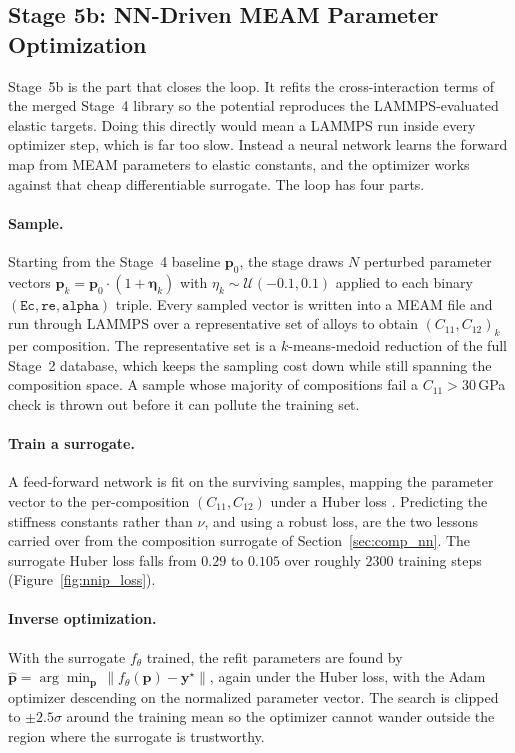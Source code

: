 \subsection{Stage 5b: NN-Driven MEAM Parameter Optimization}
\label{sec:nnip}

Stage~5b is the part that closes the loop. It refits the cross-interaction
terms of the merged Stage~4 library so the potential reproduces the
LAMMPS-evaluated elastic targets. Doing this directly would mean a LAMMPS run
inside every optimizer step, which is far too slow. Instead a neural network
learns the forward map from MEAM parameters to elastic constants, and the
optimizer works against that cheap differentiable surrogate. The loop has four
parts.

\paragraph{Sample.}
Starting from the Stage~4 baseline $\mathbf{p}_0$, the stage draws $N$
perturbed parameter vectors
$\mathbf{p}_k = \mathbf{p}_0 \cdot (1+\boldsymbol{\eta}_k)$ with
$\eta_k\sim\mathcal{U}(-0.1,0.1)$ applied to each binary
$(\texttt{Ec},\texttt{re},\texttt{alpha})$ triple. Every sampled vector is
written into a MEAM file and run through LAMMPS over a representative set of
alloys to obtain $(C_{11},C_{12})_k$ per composition. The representative set
is a $k$-means-medoid reduction of the full Stage~2 database, which keeps the
sampling cost down while still spanning the composition space. A sample whose
majority of compositions fail a $C_{11}>30$\,GPa check is thrown out before it
can pollute the training set.

\paragraph{Train a surrogate.}
A feed-forward network is fit on the surviving samples, mapping the parameter
vector to the per-composition $(C_{11},C_{12})$ under a Huber loss
\citep{tensorflow2015}. Predicting the stiffness constants rather than $\nu$,
and using a robust loss, are the two lessons carried over from the composition
surrogate of Section~\ref{sec:comp_nn}. The surrogate Huber loss falls from
$0.29$ to $0.105$ over roughly $2300$ training steps
(Figure~\ref{fig:nnip_loss}).

\paragraph{Inverse optimization.}
With the surrogate $f_\theta$ trained, the refit parameters are found by
$\hat{\mathbf{p}} = \arg\min_{\mathbf{p}}\,\lVert f_\theta(\mathbf{p}) -
\mathbf{y}^\star\rVert$, again under the Huber loss, with the Adam optimizer
\citep{kingma2015adam} descending on the normalized parameter vector. The search
is clipped to $\pm2.5\sigma$ around the training mean so the optimizer cannot
wander outside the region where the surrogate is trustworthy.

